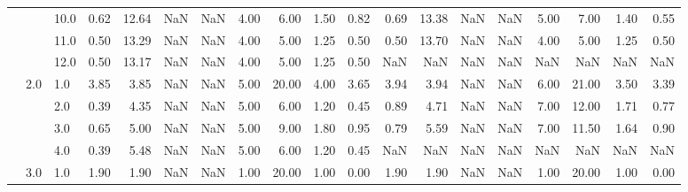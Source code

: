 \begin{tabular}{lllrrrrrrrrrrrrrrrr}
       &     & 10.0 &      0.62 &      12.64 &               NaN &                NaN & 4.00 &   6.00 &             1.50 &                         0.82 &      0.69 &      13.38 &               NaN &                NaN & 5.00 &   7.00 &             1.40 &                         0.55 \\
       &     & 11.0 &      0.50 &      13.29 &               NaN &                NaN & 4.00 &   5.00 &             1.25 &                         0.50 &      0.50 &      13.70 &               NaN &                NaN & 4.00 &   5.00 &             1.25 &                         0.50 \\
       &     & 12.0 &      0.50 &      13.17 &               NaN &                NaN & 4.00 &   5.00 &             1.25 &                         0.50 &       NaN &        NaN &               NaN &                NaN &  NaN &    NaN &              NaN &                          NaN \\
       & 2.0 & 1.0  &      3.85 &       3.85 &               NaN &                NaN & 5.00 &  20.00 &             4.00 &                         3.65 &      3.94 &       3.94 &               NaN &                NaN & 6.00 &  21.00 &             3.50 &                         3.39 \\
       &     & 2.0  &      0.39 &       4.35 &               NaN &                NaN & 5.00 &   6.00 &             1.20 &                         0.45 &      0.89 &       4.71 &               NaN &                NaN & 7.00 &  12.00 &             1.71 &                         0.77 \\
       &     & 3.0  &      0.65 &       5.00 &               NaN &                NaN & 5.00 &   9.00 &             1.80 &                         0.95 &      0.79 &       5.59 &               NaN &                NaN & 7.00 &  11.50 &             1.64 &                         0.90 \\
       &     & 4.0  &      0.39 &       5.48 &               NaN &                NaN & 5.00 &   6.00 &             1.20 &                         0.45 &       NaN &        NaN &               NaN &                NaN &  NaN &    NaN &              NaN &                          NaN \\
       & 3.0 & 1.0  &      1.90 &       1.90 &               NaN &                NaN & 1.00 &  20.00 &             1.00 &                         0.00 &      1.90 &       1.90 &               NaN &                NaN & 1.00 &  20.00 &             1.00 &                         0.00 \\

\end{tabular}

